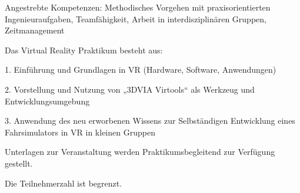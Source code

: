 \begin{course}
\begin{learningoutcomes}
Angestrebte Kompetenzen: \newline
 Methodisches Vorgehen mit praxisorientierten Ingenieuraufgaben, Teamfähigkeit, Arbeit in interdisziplinären Gruppen, Zeitmanagement


\end{learningoutcomes}

\begin{content}
Das Virtual Reality Praktikum besteht aus:

 

1. Einführung und Grundlagen in VR (Hardware, Software, Anwendungen)

 

2. Vorstellung und Nutzung von „3DVIA Virtools“ als Werkzeug und Entwicklungsumgebung

 

3. Anwendung des neu erworbenen Wissens zur Selbständigen Entwicklung eines Fahrsimulators in VR in kleinen Gruppen


\end{content}

\begin{media}Unterlagen zur Veranstaltung werden Praktikumsbegleitend zur Verfügung gestellt.

\end{media}



\begin{remarks}Die Teilnehmerzahl ist begrenzt.

\end{remarks}

\end{course}
